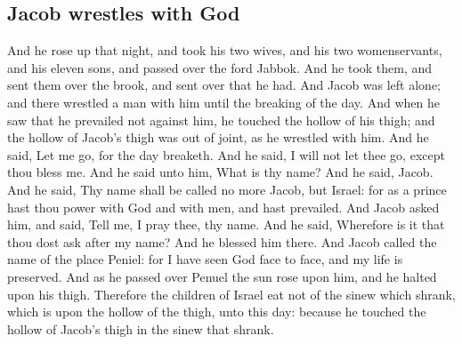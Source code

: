 \begin{biblechapter}
\section*{Jacob wrestles with God}
\verse And he rose up that night, and took his two wives, and his two womenservants, and his eleven sons, and passed over the ford Jabbok.
\verse And he took them, and sent them over the brook, and sent over that he had.
\verse And Jacob was left alone; and there wrestled a man with him until the breaking of the day.
\verse And when he saw that he prevailed not against him, he touched the hollow of his thigh; and the hollow of Jacob's thigh was out of joint, as he wrestled with him.
\verse And he said, Let me go, for the day breaketh. And he said, I will not let thee go, except thou bless me.
\verse And he said unto him, What is thy name? And he said, Jacob.
\verse And he said, Thy name shall be called no more Jacob, but Israel: for as a prince hast thou power with God and with men, and hast prevailed.
\verse And Jacob asked him, and said, Tell me, I pray thee, thy name. And he said, Wherefore is it that thou dost ask after my name? And he blessed him there.
\verse And Jacob called the name of the place Peniel: for I have seen God face to face, and my life is preserved.
\verse And as he passed over Penuel the sun rose upon him, and he halted upon his thigh.
\verse Therefore the children of Israel eat not of the sinew which shrank, which is upon the hollow of the thigh, unto this day: because he touched the hollow of Jacob's thigh in the sinew that shrank.
\end{biblechapter}

